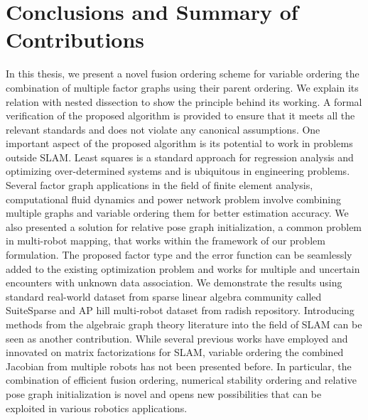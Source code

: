 \section{Conclusions and Summary of Contributions}
In this thesis, we present a novel fusion ordering scheme for variable ordering the combination of multiple factor graphs using their parent ordering. We explain its relation with nested dissection to show the principle behind its working. A formal verification of the proposed algorithm is provided to ensure that it meets all the relevant standards and does not violate any canonical assumptions. One important aspect of the proposed algorithm is its potential to work in problems outside SLAM. Least squares is a standard approach for regression analysis and optimizing over-determined systems and is ubiquitous in engineering problems. Several factor graph applications in the field of finite element analysis, computational fluid dynamics and power network problem involve combining multiple graphs and variable ordering them for better estimation accuracy. We also presented a solution for relative pose graph initialization, a common problem in multi-robot mapping, that works within the framework of our problem formulation. The proposed factor type and the error function can be seamlessly added to the existing optimization problem and works for multiple and uncertain encounters with unknown data association. We demonstrate the results using standard real-world dataset from sparse linear algebra community called SuiteSparse and AP hill multi-robot dataset from radish repository. Introducing methods from the algebraic graph theory literature into the field of SLAM can be seen as another contribution. While several previous works have employed and innovated on matrix factorizations for SLAM, variable ordering the combined Jacobian from multiple robots has not been presented before. In particular, the combination of efficient fusion ordering, numerical stability ordering and relative pose graph initialization is novel and opens new possibilities that can be exploited in various robotics applications.

